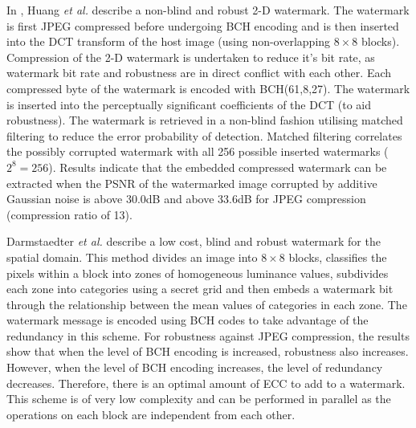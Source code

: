 \documentclass[12pt]{report}
\begin{document}
In \cite{ECCb4:huang}, Huang \emph{et al.} describe a non-blind and robust 2-D watermark. 
The watermark is first JPEG compressed before
undergoing BCH encoding and is then inserted into 
the DCT transform of the host image (using non-overlapping $8 \times 8$ blocks). Compression of the 2-D watermark is undertaken to 
reduce it's bit rate, as watermark bit rate and robustness are in direct conflict with each other. 
Each compressed byte of the watermark is encoded with BCH(61,8,27).
The watermark is inserted into the perceptually significant coefficients
of the DCT (to aid robustness). The watermark is retrieved in a non-blind fashion utilising matched filtering to reduce the
error probability of detection. 
Matched filtering correlates the possibly corrupted watermark with all 256 possible inserted watermarks ($2^{8}=256$). 
Results indicate that the embedded compressed 
watermark can be extracted when the PSNR of the watermarked image corrupted by additive Gaussian noise is above 30.0dB and above 
33.6dB for JPEG compression (compression ratio of 13). 

Darmstaedter \emph{et al.} \cite{ECCb4:darm1, ECCb4:darm2} describe a low cost, blind and robust watermark for the spatial domain. This method
divides an image into $8 \times 8$ blocks, classifies the pixels within a block into zones of homogeneous luminance values, 
subdivides each zone into categories using a secret grid and then embeds a watermark bit through the relationship between the mean
values of categories in each zone. The watermark message is encoded using BCH codes to take advantage of the redundancy in
this scheme. For robustness against JPEG compression, the results show that when the level of BCH encoding is increased, robustness
also increases. However, when the level of BCH encoding increases, the level of redundancy decreases. Therefore, there is an optimal
amount of ECC to add to a watermark. This scheme is of very low complexity and can be performed in parallel as the operations
on each block are independent from each other. 
\end{document}
